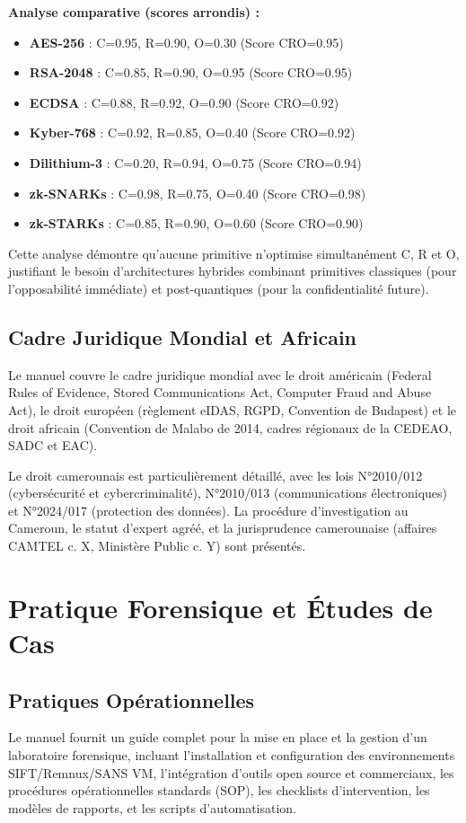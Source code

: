 \documentclass[12pt, a4paper]{article}
\begin{document}
\noindent\textbf{Analyse comparative (scores arrondis) :}
\begin{itemize}
  \item \textbf{AES-256} : C=0.95, R=0.90, O=0.30 (Score CRO=0.95)
  \item \textbf{RSA-2048} : C=0.85, R=0.90, O=0.95 (Score CRO=0.95)
  \item \textbf{ECDSA} : C=0.88, R=0.92, O=0.90 (Score CRO=0.92)
  \item \textbf{Kyber-768} : C=0.92, R=0.85, O=0.40 (Score CRO=0.92)
  \item \textbf{Dilithium-3} : C=0.20, R=0.94, O=0.75 (Score CRO=0.94)
  \item \textbf{zk-SNARKs} : C=0.98, R=0.75, O=0.40 (Score CRO=0.98)
  \item \textbf{zk-STARKs} : C=0.85, R=0.90, O=0.60 (Score CRO=0.90)
\end{itemize}

Cette analyse démontre qu'aucune primitive n'optimise simultanément C, R et O, justifiant le besoin d'architectures hybrides combinant primitives classiques (pour l'opposabilité immédiate) et post-quantiques (pour la confidentialité future).

\subsection{Cadre Juridique Mondial et Africain}
Le manuel couvre le cadre juridique mondial avec le droit américain (Federal Rules of Evidence, Stored Communications Act, Computer Fraud and Abuse Act), le droit européen (règlement eIDAS, RGPD, Convention de Budapest) et le droit africain (Convention de Malabo de 2014, cadres régionaux de la CEDEAO, SADC et EAC).

Le droit camerounais est particulièrement détaillé, avec les lois N°2010/012 (cybersécurité et cybercriminalité), N°2010/013 (communications électroniques) et N°2024/017 (protection des données). La procédure d'investigation au Cameroun, le statut d'expert agréé, et la jurisprudence camerounaise (affaires CAMTEL c. X, Ministère Public c. Y) sont présentés.

\section{Pratique Forensique et Études de Cas}

\subsection{Pratiques Opérationnelles}
Le manuel fournit un guide complet pour la mise en place et la gestion d'un laboratoire forensique, incluant l'installation et configuration des environnements SIFT/Remnux/SANS VM, l'intégration d'outils open source et commerciaux, les procédures opérationnelles standards (SOP), les checklists d'intervention, les modèles de rapports, et les scripts d'automatisation.
\end{document}
